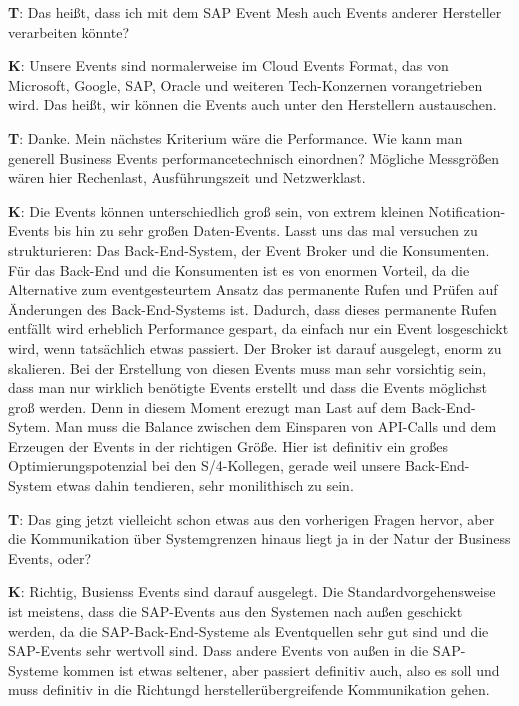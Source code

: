 \begin{list}{X:}{\setlength{\labelsep}{5mm}}
    \item[\textbf{T}:] Das hei{\ss}t, dass ich mit dem SAP Event Mesh auch Events anderer Hersteller verarbeiten könnte?
    \item[\textbf{K}:] Unsere Events sind normalerweise im Cloud Events Format, das von Microsoft, Google, SAP, Oracle und weiteren Tech-Konzernen vorangetrieben wird. Das hei{\ss}t, wir können die Events auch unter den Herstellern austauschen.
    \item[\textbf{T}:] Danke. Mein nächstes Kriterium wäre die Performance. Wie kann man generell Business Events performancetechnisch einordnen? Mögliche Messgrö{\ss}en wären hier Rechenlast, Ausführungszeit und Netzwerklast.
    \item[\textbf{K}:] Die Events können unterschiedlich gro{\ss} sein, von extrem kleinen Notification-Events bis hin zu sehr gro{\ss}en Daten-Events. Lasst uns das mal versuchen zu strukturieren: Das Back-End-System, der Event Broker und die Konsumenten. Für das Back-End und die Konsumenten ist es von enormen Vorteil, da die Alternative zum eventgesteurtem Ansatz das permanente Rufen und Prüfen auf Änderungen des Back-End-Systems ist. Dadurch, dass dieses permanente Rufen entfällt wird erheblich Performance gespart, da einfach nur ein Event losgeschickt wird, wenn tatsächlich etwas passiert. Der Broker ist darauf ausgelegt, enorm zu skalieren. Bei der Erstellung von diesen Events muss man sehr vorsichtig sein, dass man nur wirklich benötigte Events erstellt und dass die Events möglichst gro{\ss} werden. Denn in diesem Moment erezugt man Last auf dem Back-End-Sytem. Man muss die Balance zwischen dem Einsparen von API-Calls und dem Erzeugen der Events in der richtigen Grö{\ss}e. Hier ist definitiv ein gro{\ss}es Optimierungspotenzial bei den S/4-Kollegen, gerade weil unsere Back-End-System etwas dahin tendieren, sehr monilithisch zu sein.
    \item[\textbf{T}:] Das ging jetzt vielleicht schon etwas aus den vorherigen Fragen hervor, aber die Kommunikation über Systemgrenzen hinaus liegt ja in der Natur der Business Events, oder?
    \item[\textbf{K}:] Richtig, Busienss Events sind darauf ausgelegt. Die Standardvorgehensweise ist meistens, dass die SAP-Events aus den Systemen nach au{\ss}en geschickt werden, da die SAP-Back-End-Systeme als Eventquellen sehr gut sind und die SAP-Events sehr wertvoll sind. Dass andere Events von au{\ss}en in die SAP-Systeme kommen ist etwas seltener, aber passiert definitiv auch, also es soll und muss definitiv in die Richtungd herstellerübergreifende Kommunikation gehen.

\end{list}
